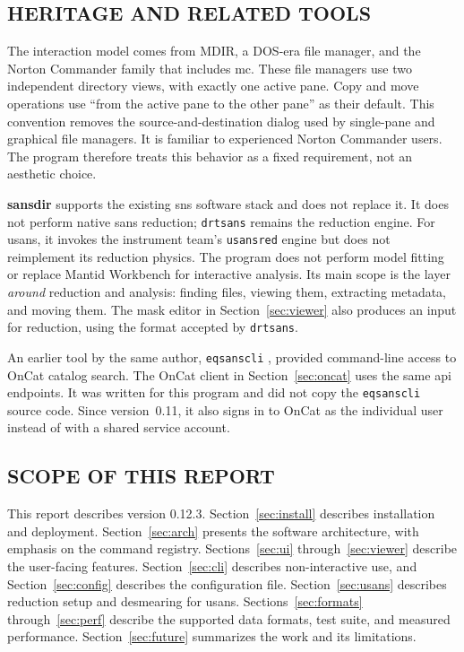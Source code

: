 \documentclass[tm]{ornltm}
\begin{document}
\subsection{HERITAGE AND RELATED TOOLS}

The interaction model comes from MDIR, a DOS-era file manager, and the Norton
Commander family that includes \ac{mc}. These file managers use two independent
directory views, with exactly one active pane. Copy and move operations use
``from the active pane to the other pane'' as their default. This convention
removes the source-and-destination dialog used by single-pane and graphical file
managers. It is familiar to experienced Norton Commander users. The program
therefore treats this behavior as a fixed requirement, not an aesthetic choice.

\textbf{sansdir} supports the existing \ac{sns} software stack and does not
replace it. It does not perform native \ac{sans} reduction;
\texttt{drtsans} remains the reduction engine. For \ac{usans}, it invokes the
instrument team's \texttt{usansred} engine but does not reimplement its reduction
physics. The program does not perform model fitting or replace Mantid Workbench
for interactive analysis. Its main scope is the layer \emph{around} reduction
and analysis: finding files, viewing them, extracting metadata, and moving them.
The mask editor in Section~\ref{sec:viewer} also produces an input for
reduction, using the format accepted by \texttt{drtsans}.

An earlier tool by the same author, \texttt{eqsanscli} \autocite{eqsanscli},
provided command-line access to OnCat catalog search. The OnCat client in
Section~\ref{sec:oncat} uses the same \ac{api} endpoints. It was written for
this program and did not copy the \texttt{eqsanscli} source code. Since
version~0.11, it also signs in to OnCat as the individual user instead of with
a shared service account.

\subsection{SCOPE OF THIS REPORT}

This report describes version 0.12.3. Section~\ref{sec:install} describes
installation and deployment. Section~\ref{sec:arch} presents the software
architecture, with emphasis on the command registry. Sections~\ref{sec:ui}
through~\ref{sec:viewer} describe the user-facing features. Section~\ref{sec:cli}
describes non-interactive use, and Section~\ref{sec:config} describes the
configuration file. Section~\ref{sec:usans} describes reduction setup and
desmearing for \ac{usans}. Sections~\ref{sec:formats} through~\ref{sec:perf}
describe the supported data formats, test suite, and measured performance.
Section~\ref{sec:future} summarizes the work and its limitations.
\end{document}
